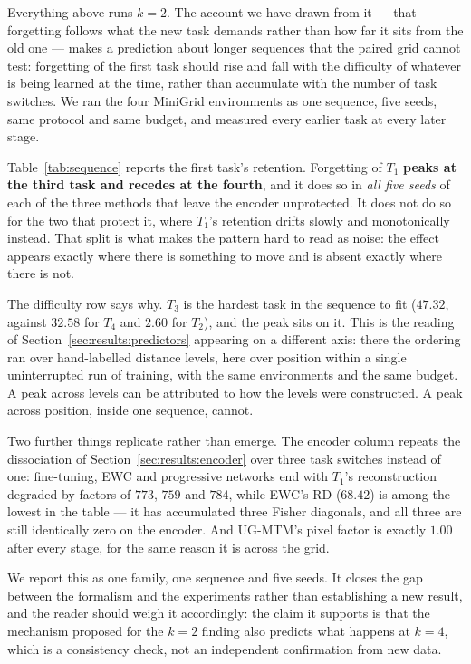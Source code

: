 Everything above runs $k = 2$. The account we have drawn from it --- that
forgetting follows what the new task demands rather than how far it sits from
the old one --- makes a prediction about longer sequences that the paired grid
cannot test: forgetting of the first task should rise and fall with the
difficulty of whatever is being learned at the time, rather than accumulate
with the number of task switches. We ran the four MiniGrid environments as one
sequence, five seeds, same protocol and same budget, and measured every earlier
task at every later stage.

Table~\ref{tab:sequence} reports the first task's retention. Forgetting of
$T_1$ \textbf{peaks at the third task and recedes at the fourth}, and it does so
in \emph{all five seeds} of each of the three methods that leave the encoder
unprotected. It does not do so for the two that protect it, where $T_1$'s
retention drifts slowly and monotonically instead. That split is what makes the
pattern hard to read as noise: the effect appears exactly where there is
something to move and is absent exactly where there is not.

The difficulty row says why. $T_3$ is the hardest task in the sequence to fit
($47.32$, against $32.58$ for $T_4$ and $2.60$ for $T_2$), and the peak sits on
it. This is the reading of Section~\ref{sec:results:predictors} appearing on a
different axis: there the ordering ran over hand-labelled distance levels, here
over position within a single uninterrupted run of training, with the same
environments and the same budget. A peak across levels can be attributed to how
the levels were constructed. A peak across position, inside one sequence,
cannot.

Two further things replicate rather than emerge. The encoder column repeats the
dissociation of Section~\ref{sec:results:encoder} over three task switches
instead of one: fine-tuning, EWC and progressive networks end with $T_1$'s
reconstruction degraded by factors of $773$, $759$ and $784$, while EWC's RD
($68.42$) is among the lowest in the table --- it has accumulated three Fisher
diagonals, and all three are still identically zero on the encoder. And UG-MTM's
pixel factor is exactly $1.00$ after every stage, for the same reason it is
across the grid.

We report this as one family, one sequence and five seeds. It closes the gap
between the formalism and the experiments rather than establishing a new
result, and the reader should weigh it accordingly: the claim it supports is
that the mechanism proposed for the $k = 2$ finding also predicts what happens
at $k = 4$, which is a consistency check, not an independent confirmation from
new data.

